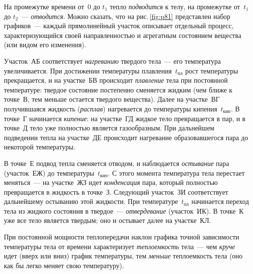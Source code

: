 \documentclass[main.tex]{subfiles}
\begin{document}
На промежутке времени от~0 до $t_1$ тепло \emph{подводится} к телу, на промежутке от~$t_1$ до $t_2$~--- \emph{отводится}. Можно сказать, что на рис.\,\ref{fig:p81} представлен набор графиков~--- каждый прямолинейный участок описывает отдельный процесс, характеризующийся своей направленностью и агрегатным состоянием вещества (или видом его изменения).

Участок~АБ соответствует \emph{нагреванию} твердого тела~--- его температура увеличивается. При достижении температуры плавления~$t_\text{пл}$ рост температуры прекращается, и на участке~БВ происходит \emph{плавление} тела при постоянной температуре: твердое состояние постепенно сменяется жидким (чем ближе к точке~В, тем меньше остается твердого вещества). Далее на участке~ВГ получившаяся жидкость (\emph{расплав}) нагревается до температуры кипения~$t_\text{кип}$. В точке~Г начинается \emph{кипение}: на участке~ГД жидкое тело превращается в пар, и в точке~Д тело уже полностью является газообразным. При дальнейшем подведении тепла на участке~ДЕ происходит нагревание образовавшегося пара до некоторой температуры. 

В точке~Е подвод тепла сменяется отводом, и наблюдается \emph{остывание} пара (участок~ЕЖ) до температуры~$t_\text{кип}$. С этого момента температура тела перестает меняться~--- на участке~ЖЗ идет \emph{конденсация} пара, который полностью превращается в жидкость в точке~З. Следующий участок~ЗИ соответствует дальнейшему остыванию этой жидкости. При температуре~$t_\text{пл}$ начинается переход тела из жидкого состояния в твердое~--- \emph{отвердевание} (участок~ИК). В точке~К уже все тело является твердым; оно и остывает далее на участке~КЛ.    

При постоянной мощности теплопередачи наклон графика точной зависимости температуры тела от времени характеризует \emph{теплоемкость} тела~--- чем \emph{круче} идет (вверх или вниз) график температуры, тем \emph{меньше} теплоемкость тела (оно как бы легко меняет свою температуру). 







 
\end{document}
